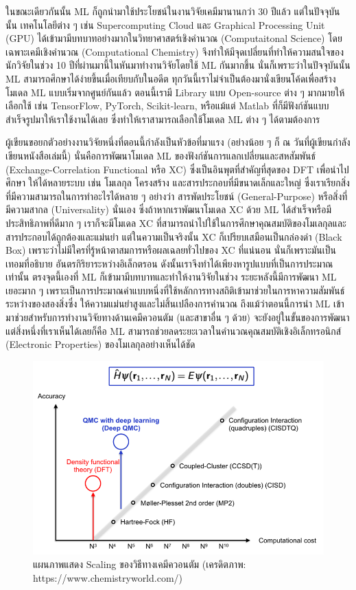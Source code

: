 ในขณะเดียวกันนั้น ML ก็ถูกนำมาใช้ประโยชน์ในงานวิจัยเคมีมานานกว่า 30 ปีแล้ว แต่ในปัจจุบันนั้น เทคโนโลยีต่าง ๆ เช่น Supercomputing Cloud และ 
Graphical Processing Unit (GPU) ได้เข้ามามีบทบาทอย่างมากในวิทยาศาสตร์เชิงคำนวณ (Computaitonal Science) โดยเฉพาะเคมีเชิงคำนวณ 
(Computational Chemistry) จึงทำให้มีจุดเปลี่ยนที่ทำให้ความสนใจของนักวิจัยในช่วง 10 ปีที่ผ่านมานี้ในหันมาทำงานวิจัยโดยใช้ ML กันมากขึ้น 
นั่นก็เพราะว่าในปัจจุบันนั้น ML สามารถศึกษาได้ง่ายขึ้นเมื่อเทียบกับในอดีต ทุกวันนี้เราไม่จำเป็นต้องมานั่งเขียนโค้ดเพื่อสร้างโมเดล ML แบบเริ่มจากศูนย์กันแล้ว 
ตอนนี้เรามี Library แบบ Open-source ต่าง ๆ มากมายให้เลือกใช้ เช่น TensorFlow, PyTorch, Scikit-learn, หรือแม้แต่ Matlab 
ที่ก็มีฟังก์ชันแบบสำเร็จรูปมาให้เราใช้งานได้เลย ซึ่งทำให้เราสามารถเลือกใช้โมเดล ML ต่าง ๆ ได้ตามต้องการ

ผู้เขียนขอยกตัวอย่างงานวิจัยหนึ่งที่ตอนนี้กำลังเป็นหัวข้อที่มาแรง (อย่างน้อย ๆ ก็ ณ วันที่ผู้เขียนกำลังเขียนหนังสือเล่มนี้) นั่นคือการพัฒนาโมเดล ML 
ของฟังก์ชันการแลกเปลี่ยนและสหสัมพันธ์ (Exchange-Correlation Functional หรือ XC) ซึ่งเป็นอินพุตที่สำคัญที่สุดของ DFT เพื่อนำไปศึกษา%
ให้ได้หลายระบบ เช่น โมเลกุล โครงสร้าง และสารประกอบที่มีขนาดเล็กและใหญ่ ซึ่งเราเรียกสิ่งที่มีความสามารถในการทำอะไรได้หลาย ๆ อย่างว่า%
สารพัดประโยชน์ (General-Purpose) หรือสิ่งที่มีความสากล (Universality) นั่นเอง ซึ่งถ้าหากเราพัฒนาโมเดล XC ด้วย ML ได้สำเร็จหรือมี%
ประสิทธิภาพที่ดีมาก ๆ เราก็จะมีโมเดล XC ที่สามารถนำไปใช้ในการศึกษาคุณสมบัติของโมเลกุลและสารประกอบได้ถูกต้องและแม่นยำ แต่ในความเป็นจริงนั้น 
XC ก็เปรียบเสมือนเป็นกล่องดำ (Black Box) เพราะว่าไม่มีใครที่รู้หน้าตาสมการหรือผลเฉลยทั่วไปของ XC ที่แน่นอน นั่นก็เพราะมันเป็นเทอมที่อธิบาย%
อันตรกิริยาระหว่างอิเล็กตรอน ดังนั้นเราจึงทำได้เพียงหารูปแบบที่เป็นการประมาณเท่านั้น ตรงจุดนี้เองที่ ML ก็เข้ามามีบทบาทและทำให้งานวิจัยในช่วง%
ระยะหลังนี้มีการพัฒนา ML เยอะมาก ๆ เพราะเป็นการประมาณค่าแบบหนึ่งที่ใช้หลักการทางสถิติเข้ามาช่วยในการหาความสัมพันธ์ระหว่างของสองสิ่งซึ่ง%
ให้ความแม่นยำสูงและไม่สิ้นเปลืองการคำนวณ ถึงแม้ว่าตอนนี้การนำ ML เข้ามาช่วยสำหรับการทำงานวิจัยทางด้านเคมึควอนตัม (และสาขาอื่น ๆ ด้วย) 
จะยังอยู่ในขั้นของการพัฒนา แต่สิ่งหนึ่งที่เราเห็นได้เลยก็คือ ML สามารถช่วยลดระยะเวลาในคำนวณคุณสมบัติเชิงอิเล็กทรอนิกส์ (Electronic Properties) 
ของโมเลกุลอย่างเห็นได้ชัด

\begin{figure}[H]
    \centering
    \includegraphics[width=0.8\linewidth]{fig/qm_scaling.png}
    \caption{แผนภาพแสดง Scaling ของวิธีทางเคมีควอนตัม (เครดิตภาพ: https://www.chemistryworld.com/)}
    \label{fig:qm_scaling}
\end{figure}

